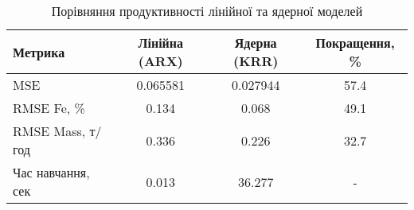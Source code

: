 
    \begin{table}[h]
    \centering
    \caption{Порівняння продуктивності лінійної та ядерної моделей}
    \label{tab:model_comparison}
    \begin{tabular}{|l|c|c|c|}
    \hline
    \textbf{Метрика} & \textbf{Лінійна (ARX)} & \textbf{Ядерна (KRR)} & \textbf{Покращення, \%} \\
    \hline
    MSE & 0.065581 & 0.027944 & 57.4 \\
    \hline
    RMSE Fe, \% & 0.134 & 0.068 & 49.1 \\
    \hline
    RMSE Mass, т/год & 0.336 & 0.226 & 32.7 \\
    \hline
    Час навчання, сек & 0.013 & 36.277 & - \\
    \hline
    \end{tabular}
    \end{table}
    